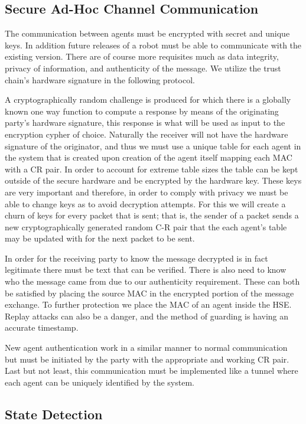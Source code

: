 \documentclass[conference]{IEEEtran}
\begin{document}
\subsection{Secure Ad-Hoc Channel Communication}

The communication between agents must be encrypted with secret and unique keys. In addition future releases of a robot must be able to communicate with the existing version. There are of course more requisites much as data integrity, privacy of information, and authenticity of the message. We utilize the trust chain's hardware signature in the following protocol.

A cryptographically random challenge is produced for which there is a globally known one way function to compute a response by means of the originating party's hardware signature, this response is what will be used as input to the encryption cypher of choice. Naturally the receiver will not have the hardware signature of the originator, and thus we must use a unique table for each agent in the system that is created upon creation of the agent itself mapping each MAC with a CR pair. In order to account for extreme table sizes the table can be kept outside of the secure hardware and be encrypted by the hardware key. These keys are very important and therefore, in order to comply with privacy we must be able to change keys as to avoid decryption attempts. For this we will create a churn of keys for every packet that is sent; that is, the sender of a packet sends a new cryptographically generated random C-R pair that the each agent's table may be updated with for the next packet to be sent.
	
In order for the receiving party to know the message decrypted is in fact legitimate there must be text that can be verified. There is also need to know who the message came from due to our authenticity requirement. These can both be satisfied by placing the source MAC in the encrypted portion of the message exchange. To further protection we place the MAC of an agent inside the HSE. Replay attacks can also be a danger, and the method of guarding is having an accurate timestamp.
	
New agent authentication work in a similar manner to normal communication but must be initiated by the party with the appropriate and working CR pair. Last but not least, this communication must be implemented like a tunnel where each agent can be uniquely identified by the system.

\subsection{State Detection}
\end{document}
